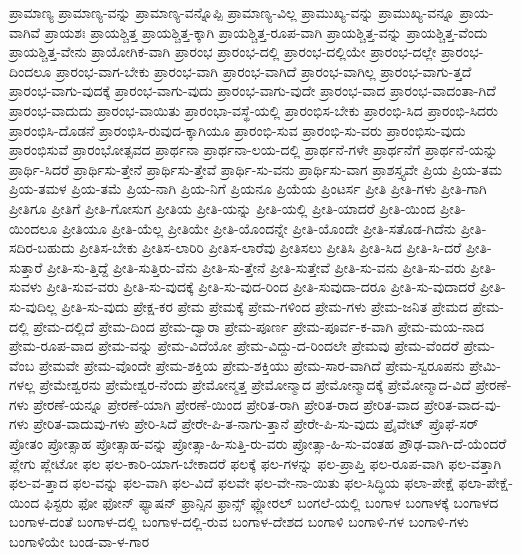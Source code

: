 {ಪ್ರಾಮಾಣ್ಯ
ಪ್ರಾಮಾಣ್ಯ-ವನ್ನು
ಪ್ರಾಮಾಣ್ಯ-ವನ್ನೊಪ್ಪಿ
ಪ್ರಾಮಾಣ್ಯ-ವಿಲ್ಲ
ಪ್ರಾಮುಖ್ಯ-ವನ್ನು
ಪ್ರಾಮುಖ್ಯ-ವನ್ನೂ
ಪ್ರಾಯ-ವಾಗಿವೆ
ಪ್ರಾಯಶಃ
ಪ್ರಾಯಶ್ಚಿತ್ತ
ಪ್ರಾಯಶ್ಚಿತ್ತ-ಕ್ಕಾಗಿ
ಪ್ರಾಯಶ್ಚಿತ್ತ-ರೂಪ-ವಾಗಿ
ಪ್ರಾಯಶ್ಚಿತ್ತ-ವನ್ನು
ಪ್ರಾಯಶ್ಚಿತ್ತ-ವೆಂದು
ಪ್ರಾಯಶ್ಚಿತ್ತ-ವೇನು
ಪ್ರಾಯೋಗಿಕ-ವಾಗಿ
ಪ್ರಾರಂಭ
ಪ್ರಾರಂಭ-ದಲ್ಲಿ
ಪ್ರಾರಂಭ-ದಲ್ಲಿಯೇ
ಪ್ರಾರಂಭ-ದಲ್ಲೇ
ಪ್ರಾರಂಭ-ದಿಂದಲೂ
ಪ್ರಾರಂಭ-ವಾಗ-ಬೇಕು
ಪ್ರಾರಂಭ-ವಾಗಿ
ಪ್ರಾರಂಭ-ವಾಗಿದೆ
ಪ್ರಾರಂಭ-ವಾಗಿಲ್ಲ
ಪ್ರಾರಂಭ-ವಾಗು-ತ್ತದೆ
ಪ್ರಾರಂಭ-ವಾಗು-ವುದಕ್ಕೆ
ಪ್ರಾರಂಭ-ವಾಗು-ವುದು
ಪ್ರಾರಂಭ-ವಾಗು-ವುದೇ
ಪ್ರಾರಂಭ-ವಾದ
ಪ್ರಾರಂಭ-ವಾದಂತಾ-ಗಿದೆ
ಪ್ರಾರಂಭ-ವಾದುದು
ಪ್ರಾರಂಭ-ವಾಯಿತು
ಪ್ರಾರಂಭಾ-ವಸ್ಥೆ-ಯಲ್ಲಿ
ಪ್ರಾರಂಭಿಸ-ಬೇಕು
ಪ್ರಾರಂಭಿ-ಸಿದ
ಪ್ರಾರಂಭಿ-ಸಿದರು
ಪ್ರಾರಂಭಿಸಿ-ದೊಡನೆ
ಪ್ರಾರಂಭಿಸಿ-ರುವುದ-ಕ್ಕಾಗಿಯೂ
ಪ್ರಾರಂಭಿ-ಸುವ
ಪ್ರಾರಂಭಿ-ಸು-ವರು
ಪ್ರಾರಂಭಿಸು-ವುದು
ಪ್ರಾರಂಭಿಸುವೆ
ಪ್ರಾರಂಭೋತ್ಸವದ
ಪ್ರಾರ್ಥನಾ
ಪ್ರಾರ್ಥನಾ-ಲಯ-ದಲ್ಲಿ
ಪ್ರಾರ್ಥನೆ-ಗಳೇ
ಪ್ರಾರ್ಥನೆಗೆ
ಪ್ರಾರ್ಥನೆ-ಯನ್ನು
ಪ್ರಾರ್ಥಿ-ಸಿದರೆ
ಪ್ರಾರ್ಥಿಸು-ತ್ತೇನೆ
ಪ್ರಾರ್ಥಿಸು-ತ್ತೇವೆ
ಪ್ರಾರ್ಥಿ-ಸು-ವನು
ಪ್ರಾರ್ಥಿಸು-ವಾಗ
ಪ್ರಾಶಸ್ತ್ಯವೇ
ಪ್ರಿಯ
ಪ್ರಿಯ-ತಮ
ಪ್ರಿಯ-ತಮಳ
ಪ್ರಿಯ-ತಮೆ
ಪ್ರಿಯ-ನಾಗಿ
ಪ್ರಿಯ-ನಿಗೆ
ಪ್ರಿಯನೂ
ಪ್ರಿಯೆಯ
ಪ್ರಿಂಟರ್ಸ
ಪ್ರೀತಿ
ಪ್ರೀತಿ-ಗಳು
ಪ್ರೀತಿ-ಗಾಗಿ
ಪ್ರೀತಿಗೂ
ಪ್ರೀತಿಗೆ
ಪ್ರೀತಿ-ಗೋಸುಗ
ಪ್ರೀತಿಯ
ಪ್ರೀತಿ-ಯನ್ನು
ಪ್ರೀತಿ-ಯಲ್ಲಿ
ಪ್ರೀತಿ-ಯಾದರೆ
ಪ್ರೀತಿ-ಯಿಂದ
ಪ್ರೀತಿ-ಯಿಂದಲೂ
ಪ್ರೀತಿಯೂ
ಪ್ರೀತಿ-ಯೆಲ್ಲ
ಪ್ರೀತಿಯೇ
ಪ್ರೀತಿ-ಯೊಂದನ್ನೇ
ಪ್ರೀತಿ-ಯೊಂದೇ
ಪ್ರೀತಿ-ಸತೊಡ-ಗಿದೆನು
ಪ್ರೀತಿ-ಸದಿರ-ಬಹುದು
ಪ್ರೀತಿಸ-ಬೇಕು
ಪ್ರೀತಿಸ-ಲಾರಿರಿ
ಪ್ರೀತಿಸ-ಲಾರೆವು
ಪ್ರೀತಿಸಲು
ಪ್ರೀತಿಸಿ
ಪ್ರೀತಿ-ಸಿದ
ಪ್ರೀತಿ-ಸಿ-ದರೆ
ಪ್ರೀತಿ-ಸುತ್ತಾರೆ
ಪ್ರೀತಿ-ಸು-ತ್ತಿದ್ದೆ
ಪ್ರೀತಿ-ಸುತ್ತಿರು-ವೆನು
ಪ್ರೀತಿ-ಸು-ತ್ತೇನೆ
ಪ್ರೀತಿ-ಸುತ್ತೇವೆ
ಪ್ರೀತಿ-ಸು-ವನು
ಪ್ರೀತಿ-ಸು-ವರು
ಪ್ರೀತಿ-ಸುವಳು
ಪ್ರೀತಿ-ಸುವ-ವರು
ಪ್ರೀತಿ-ಸು-ವುದಕ್ಕೆ
ಪ್ರೀತಿ-ಸು-ವುದ-ರಿಂದ
ಪ್ರೀತಿ-ಸುವುದಾ-ದರೂ
ಪ್ರೀತಿ-ಸು-ವುದಾದರೆ
ಪ್ರೀತಿ-ಸು-ವುದಿಲ್ಲ
ಪ್ರೀತಿ-ಸು-ವುದು
ಪ್ರೇಕ್ಷ-ಕರ
ಪ್ರೇಮ
ಪ್ರೇಮಕ್ಕೆ
ಪ್ರೇಮ-ಗಳಿಂದ
ಪ್ರೇಮ-ಗಳು
ಪ್ರೇಮ-ಜನಿತ
ಪ್ರೇಮದ
ಪ್ರೇಮ-ದಲ್ಲಿ
ಪ್ರೇಮ-ದಲ್ಲಿದೆ
ಪ್ರೇಮ-ದಿಂದ
ಪ್ರೇಮ-ದ್ವಾರಾ
ಪ್ರೇಮ-ಪೂರ್ಣ
ಪ್ರೇಮ-ಪೂರ್ವ-ಕ-ವಾಗಿ
ಪ್ರೇಮ-ಮಯ-ನಾದ
ಪ್ರೇಮ-ರೂಪ-ವಾದ
ಪ್ರೇಮ-ವನ್ನು
ಪ್ರೇಮ-ವಿದೆಯೋ
ಪ್ರೇಮ-ವಿದ್ದು-ದ-ರಿಂದಲೇ
ಪ್ರೇಮವು
ಪ್ರೇಮ-ವೆಂದರೆ
ಪ್ರೇಮ-ವೆಂಬ
ಪ್ರೇಮವೇ
ಪ್ರೇಮ-ವೊಂದೇ
ಪ್ರೇಮ-ಶಕ್ತಿಯ
ಪ್ರೇಮ-ಶಕ್ತಿಯು
ಪ್ರೇಮ-ಸಾರ-ವಾಗಿದೆ
ಪ್ರೇಮ-ಸ್ವರೂಪನು
ಪ್ರೇಮಿ-ಗಳಲ್ಲ
ಪ್ರೇಮೇಶ್ವರನು
ಪ್ರೇಮೇಶ್ವರ-ನೆಂದು
ಪ್ರೇಮೋನ್ಮತ್ತ
ಪ್ರೇಮೋನ್ಮಾದ
ಪ್ರೇಮೋನ್ಮಾದಕ್ಕೆ
ಪ್ರೇಮೋನ್ಮಾದ-ವಿದೆ
ಪ್ರೇರಣೆ-ಗಳು
ಪ್ರೇರಣೆ-ಯನ್ನೂ
ಪ್ರೇರಣೆ-ಯಾಗಿ
ಪ್ರೇರಣೆ-ಯಿಂದ
ಪ್ರೇರಿತ-ರಾಗಿ
ಪ್ರೇರಿತ-ರಾದ
ಪ್ರೇರಿತ-ವಾದ
ಪ್ರೇರಿತ-ವಾದ-ವು-ಗಳು
ಪ್ರೇರಿತ-ವಾದುವು-ಗಳು
ಪ್ರೇರಿ-ಸಿದೆ
ಪ್ರೇರೇ-ಪಿ-ತ-ನಾಗು-ತ್ತಾನೆ
ಪ್ರೇರೇ-ಪಿ-ಸು-ವುದು
ಪ್ರೈವೇಟ್
ಪ್ರೊಫೆ-ಸರ್
ಪ್ರೋತಂ
ಪ್ರೋತ್ಸಾಹ
ಪ್ರೋತ್ಸಾಹ-ವನ್ನು
ಪ್ರೋತ್ಸಾ-ಹಿ-ಸುತ್ತಿ-ರು-ವರು
ಪ್ರೋತ್ಸಾ-ಹಿ-ಸು-ವಂತಹ
ಪ್ರೌಢ-ವಾಗಿ-ದೆ-ಯೆಂದರೆ
ಪ್ಲೇಗು
ಪ್ಲೇಟೋ
ಫಲ
ಫಲ-ಕಾರಿ-ಯಾಗ-ಬೇಕಾದರೆ
ಫಲಕ್ಕೆ
ಫಲ-ಗಳನ್ನು
ಫಲ-ಪ್ರಾಪ್ತಿ
ಫಲ-ರೂಪ-ವಾಗಿ
ಫಲ-ವತ್ತಾಗಿ
ಫಲ-ವ-ತ್ತಾದ
ಫಲ-ವನ್ನು
ಫಲ-ವಾಗಿ
ಫಲ-ವಿದೆ
ಫಲವೇ
ಫಲ-ವೇ-ನಾ-ಯಿತು
ಫಲ-ಸಿದ್ಧಿಯ
ಫಲಾ-ಪೇಕ್ಷೆ
ಫಲಾ-ಪೇಕ್ಷೆ-ಯಿಂದ
ಫಿಸ್ಟರು
ಫೋ
ಫೋನ್
ಫ್ಯಾಷನ್
ಫ್ರಾನ್ಸಿನ
ಫ್ರಾನ್ಸ್
ಫ್ಲೋರಲ್
ಬಂಗಲೆ-ಯಲ್ಲಿ
ಬಂಗಾಳ
ಬಂಗಾಳಕ್ಕೆ
ಬಂಗಾಳದ
ಬಂಗಾಳ-ದಂತೆ
ಬಂಗಾಳ-ದಲ್ಲಿ
ಬಂಗಾಳ-ದಲ್ಲಿ-ರುವ
ಬಂಗಾಳ-ದೇಶದ
ಬಂಗಾಳಿ
ಬಂಗಾಳಿ-ಗಳ
ಬಂಗಾಳಿ-ಗಳು
ಬಂಗಾಳಿಯೇ
ಬಂಡ-ವಾ-ಳ-ಗಾರ
}
